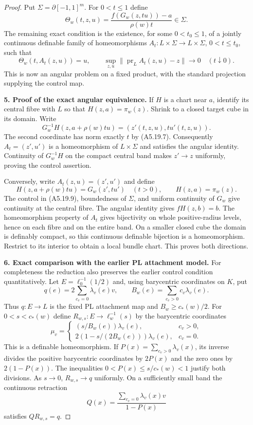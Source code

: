\begin{proof}
Put $\Sigma=\partial[-1,1]^m$. For $0<t\le1$ define
\[
 \Theta_w(t,z,u)=
 \frac{f(G_w(z,tu))-a}{\rho(w)t}\in\Sigma.
 \tag{A5.19.8}
\]
The remaining exact condition is the existence, for some $0<t_0\le1$, of a
jointly continuous definable family of homeomorphisms
$A_t:L\times\Sigma\to L\times\Sigma$, $0<t\le t_0$, such that
\[
 \Theta_w(t,A_t(z,u))=u,
 \qquad
 \sup_{z,u}\|\operatorname{pr}_L A_t(z,u)-z\|\longrightarrow0
 \quad(t\downarrow0).
 \tag{A5.19.9}
\]
This is now an angular problem on a fixed product, with the standard
projection supplying the control map.

\textbf{5. Proof of the exact angular equivalence.}\quad
If $H$ is a chart near $a$, identify its central fibre with $L$ so that
$H(z,a)=\pi_w(z)$. Shrink to a closed target cube in its domain. Write
\[
 G_w^{-1}H(z,a+\rho(w)tu)=(z'(t,z,u),t u'(t,z,u)).
\]
The second coordinate has norm exactly $t$ by (A5.19.7). Consequently
$A_t=(z',u')$ is a homeomorphism of $L\times\Sigma$ and satisfies the
angular identity. Continuity of $G_w^{-1}H$ on the compact central band
makes $z'\to z$ uniformly, proving the control assertion.

Conversely, write $A_t(z,u)=(z',u')$ and define
\[
 H(z,a+\rho(w)tu)=G_w(z',tu')\quad(t>0),
 \qquad H(z,a)=\pi_w(z).
 \tag{A5.19.10}
\]
The control in (A5.19.9), boundedness of $\Sigma$, and uniform continuity
of $G_w$ give continuity at the central fibre. The angular identity gives
$fH(z,b)=b$. The homeomorphism property of $A_t$ gives bijectivity on
whole positive-radius levels, hence on each fibre and on the entire band.
On a smaller closed cube the domain is definably compact, so this
continuous definable bijection is a homeomorphism. Restrict to its
interior to obtain a local bundle chart. This proves both directions.

\textbf{6. Exact comparison with the earlier PL attachment model.}\quad
For completeness the reduction also preserves the earlier control
condition quantitatively. Let $E=\ell_0^{-1}(1/2)$ and, using barycentric
coordinates on $K$, put
\[
 q(e)=2\sum_{c_v=0}\lambda_v(e)v,\qquad
 B_w(e)=\sum_{c_v>0}c_v\lambda_v(e).
\]
Thus $q:E\to L$ is the fixed PL attachment map and $B_w\ge c_*(w)/2$.
For $0<s<c_*(w)$ define $R_{w,s}:E\to\ell_w^{-1}(s)$ by the barycentric
coordinates
\[
 \mu_v=
 \begin{cases}
 (s/B_w(e))\lambda_v(e),&c_v>0,\\
 2(1-s/(2B_w(e)))\lambda_v(e),&c_v=0.
 \end{cases}
\tag{A5.19.11}
\]
This is a definable homeomorphism. If $P(x)=\sum_{c_v>0}\lambda_v(x)$,
its inverse divides the positive barycentric coordinates by $2P(x)$ and
the zero ones by $2(1-P(x))$. The inequalities
$0<P(x)\le s/c_*(w)<1$ justify both divisions. As $s\to0$,
$R_{w,s}\to q$ uniformly. On a sufficiently small band the continuous
retraction
\[
 Q(x)=\frac{\sum_{c_v=0}\lambda_v(x)v}{1-P(x)}
\]
satisfies $Q R_{w,s}=q$.


\end{proof}
